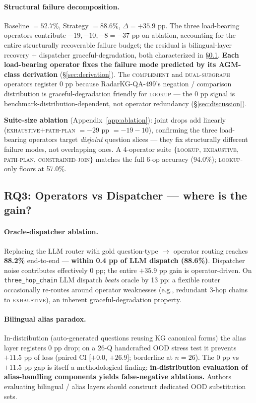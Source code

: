 \documentclass[11pt,a4paper]{article}
\newcommand{\qtype}[1]{\texttt{\small #1}}
\newcommand{\op}[1]{\textsc{\small #1}}
\begin{document}
\paragraph{Structural failure decomposition.}
Baseline $= 52.7\%$, Strategy $= 88.6\%$, $\Delta=+35.9$ pp. The three load-bearing operators contribute $-19, -10, -8 = -37$ pp on ablation, accounting for the entire structurally recoverable failure budget; the residual is bilingual-layer recovery $+$ dispatcher graceful-degradation, both characterized in §\ref{sec:rq3}. \textbf{Each load-bearing operator fixes the failure mode predicted by its AGM-class derivation} (§\ref{sec:derivation}). The \op{complement} and \op{dual-subgraph} operators register 0 pp because RadarKG-QA-499's negation / comparison distribution is graceful-degradation friendly for \op{lookup} --- the 0 pp signal is benchmark-distribution-dependent, not operator redundancy (§\ref{sec:discussion}).

\textbf{Suite-size ablation} (Appendix~\ref{app:ablation}): joint drops add linearly (\op{exhaustive}$+$\op{path-plan} $= -29$ pp $= -19{-}10$), confirming the three load-bearing operators target \emph{disjoint} question slices --- they fix structurally different failure modes, not overlapping ones. A 4-operator suite $\{$\op{lookup}, \op{exhaustive}, \op{path-plan}, \op{constrained-join}$\}$ matches the full 6-op accuracy (94.0\%); \op{lookup}-only floors at 57.0\%.

\subsection{RQ3: Operators vs Dispatcher --- where is the gain?}
\label{sec:rq3}

\paragraph{Oracle-dispatcher ablation.}
Replacing the LLM router with gold question-type $\to$ operator routing reaches \textbf{88.2\%} end-to-end --- \textbf{within 0.4 pp of LLM dispatch (88.6\%)}. Dispatcher noise contributes effectively 0 pp; the entire $+35.9$ pp gain is operator-driven. On \qtype{three\_hop\_chain} LLM dispatch \emph{beats} oracle by 13 pp: a flexible router occasionally re-routes around operator weaknesses (e.g., redundant 3-hop chains to \op{exhaustive}), an inherent graceful-degradation property.

\paragraph{Bilingual alias paradox.}
In-distribution (auto-generated questions reusing KG canonical forms) the alias layer registers 0 pp drop; on a 26-Q handcrafted OOD stress test it prevents $+11.5$ pp of loss (paired CI [$+0.0$, $+26.9$]; borderline at $n\!=\!26$). The 0 pp vs $+11.5$ pp gap is itself a methodological finding: \textbf{in-distribution evaluation of alias-handling components yields false-negative ablations.} Authors evaluating bilingual / alias layers should construct dedicated OOD substitution sets.
\end{document}
